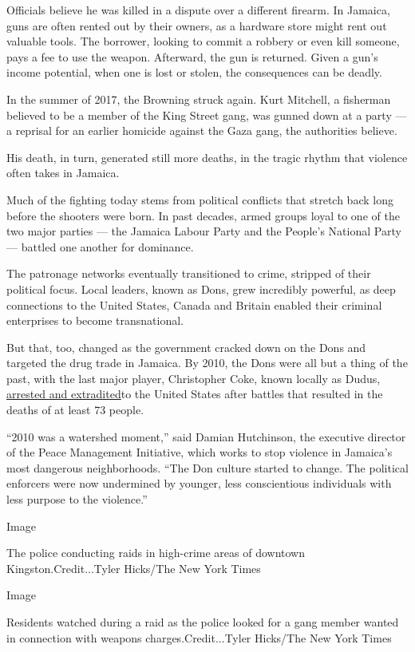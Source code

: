 Officials believe he was killed in a dispute over a different firearm.
In Jamaica, guns are often rented out by their owners, as a hardware
store might rent out valuable tools. The borrower, looking to commit a
robbery or even kill someone, pays a fee to use the weapon. Afterward,
the gun is returned. Given a gun's income potential, when one is lost or
stolen, the consequences can be deadly.

In the summer of 2017, the Browning struck again. Kurt Mitchell, a
fisherman believed to be a member of the King Street gang, was gunned
down at a party --- a reprisal for an earlier homicide against the Gaza
gang, the authorities believe.

His death, in turn, generated still more deaths, in the tragic rhythm
that violence often takes in Jamaica.

Much of the fighting today stems from political conflicts that stretch
back long before the shooters were born. In past decades, armed groups
loyal to one of the two major parties --- the Jamaica Labour Party and
the People's National Party --- battled one another for dominance.

The patronage networks eventually transitioned to crime, stripped of
their political focus. Local leaders, known as Dons, grew incredibly
powerful, as deep connections to the United States, Canada and Britain
enabled their criminal enterprises to become transnational.

But that, too, changed as the government cracked down on the Dons and
targeted the drug trade in Jamaica. By 2010, the Dons were all but a
thing of the past, with the last major player, Christopher Coke, known
locally as Dudus,
\href{https://www.nytimes.com/2010/06/26/world/americas/26coke.html}{arrested
and extradited}to the United States after battles that resulted in the
deaths of at least 73 people.

``2010 was a watershed moment,'' said Damian Hutchinson, the executive
director of the Peace Management Initiative, which works to stop
violence in Jamaica's most dangerous neighborhoods. ``The Don culture
started to change. The political enforcers were now undermined by
younger, less conscientious individuals with less purpose to the
violence.''

Image

The police conducting raids in high-crime areas of downtown
Kingston.Credit...Tyler Hicks/The New York Times

Image

Residents watched during a raid as the police looked for a gang member
wanted in connection with weapons charges.Credit...Tyler Hicks/The New
York Times

